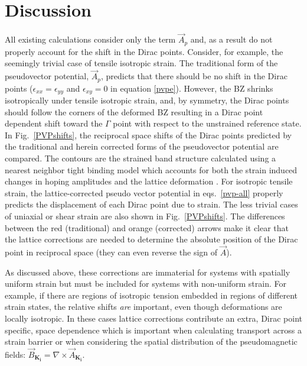 \section{Discussion}

All existing calculations consider only the term $\vec{A}_p$ and, as a result do not properly account for the shift in the Dirac points.
Consider, for example, the seemingly trivial case of tensile isotropic strain.
The traditional form of the pseudovector potential, $\vec{A}_p$, predicts that there should be no shift in the Dirac points ($\epsilon_{xx}=\epsilon_{yy}$ and $\epsilon_{xy}=0$ in equation \ref{pvpe}).
However, the BZ shrinks isotropically under tensile isotropic strain, and, by symmetry, the Dirac points should follow the corners of the deformed BZ resulting in a Dirac point dependent shift toward the $\Gamma$ point with respect to the unstrained reference state.
In Fig.~\ref{PVPshifts}, the reciprocal space shifts of the Dirac points predicted by the traditional and herein corrected forms of the pseudovector potential are compared.
The contours are the strained band structure calculated using a nearest neighbor tight binding model which accounts for both the strain induced changes in hoping amplitudes and the lattice deformation \cite{Pereira2009}.
For isotropic tensile strain, the lattice-corrected pseudo vector potential in eqs.~\eqref{pvp-all} properly predicts the displacement of each Dirac point due to strain.
The less trivial cases of uniaxial or shear strain are also shown in Fig.~\ref{PVPshifts}. The differences between the red (traditional) and orange (corrected) arrows make it clear that the lattice corrections are needed to determine the absolute position of the Dirac point in reciprocal space (they can even reverse the sign of $\vec{A}$).

As discussed above, these corrections are immaterial for systems with spatially uniform strain but must be included for systems with non-uniform strain.
For example, if there are regions of isotropic tension embedded in regions of different strain states, the relative shifts \emph{are} important, even though deformations are locally isotropic.
In these cases lattice corrections contribute an extra, Dirac point specific, space dependence which is important when calculating transport across a strain barrier or when considering the spatial distribution of the pseudomagnetic fields: $\vec{B}_{\bm{K_i}} = \nabla \times \vec{A}_{\bm{K_i}}$.

